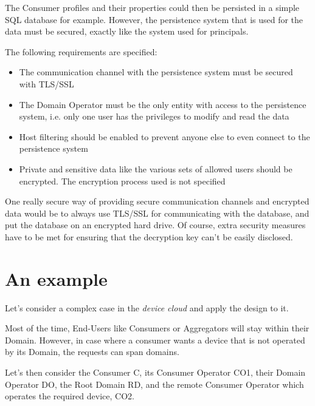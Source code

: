 The Consumer profiles and their properties could then be persisted in a simple SQL database for example. However, the persistence system that is used for the data must be secured, exactly like the system used for principals.

The following requirements are specified:

\begin{itemize}
	\item The communication channel with the persistence system must be secured with TLS/SSL
	\item The Domain Operator must be the only entity with access to the persistence system, i.e. only one user has the privileges to modify and read the data
	\item Host filtering should be enabled to prevent anyone else to even connect to the persistence system
	\item Private and sensitive data like the various sets of allowed users should be encrypted. The encryption process used is not specified
\end{itemize}

One really secure way of providing secure communication channels and encrypted data would be to always use TLS/SSL for communicating with the database, and put the database on an encrypted hard drive. Of course, extra security measures have to be met for ensuring that the decryption key can't be easily disclosed.
	


\section{An example}
Let's consider a complex case in the \emph{device cloud} and apply the design to it.

Most of the time, End-Users like Consumers or Aggregators will stay within their Domain. However, in case where a consumer wants a device that is not operated by its Domain, the requests can span domains.

Let's then consider the Consumer C, its Consumer Operator CO1, their Domain Operator DO, the Root Domain RD, and the remote Consumer Operator which operates the required device, CO2.

